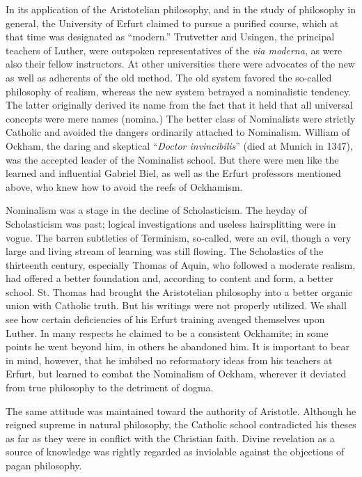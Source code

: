 In its application of the Aristotelian philosophy, and in the study
of philosophy in general, the University of Erfurt claimed to pursue
a purified course, which at that time was designated as “modern.”
Trutvetter and Usingen, the principal teachers of Luther, were outspoken
representatives of the \textit{via moderna}, as were also their fellow
instructors. At other universities there were advocates of the new as
well as adherents of the old method. The old system favored the so-called
philosophy of realism, whereas the new system betrayed
a nominalistic tendency. The latter originally derived its name
from the fact that it held that all universal concepts were mere
names (nomina.) The better class of Nominalists were strictly Catholic
and avoided the dangers ordinarily attached to Nominalism. William
of Ockham, the daring and skeptical “\textit{Doctor invincibilis}” (died
at Munich in 1347), was the accepted leader of the Nominalist school.
But there were men like the learned and influential Gabriel Biel, as
well as the Erfurt professors mentioned above, who knew how to
avoid the reefs of Ockhamism.

Nominalism was a stage in the decline of Scholasticism. The heyday
of Scholasticism was past; logical investigations and useless hairsplitting
were in vogue. The barren subtleties of Terminism, so-called,
were an evil, though a very large and living stream of learning was
still flowing. The Scholastics of the thirteenth century, especially
Thomas of Aquin, who followed a moderate realism, had offered a
better foundation and, according to content and form, a better
school. St. Thomas had brought the Aristotelian philosophy into a
better organic union with Catholic truth. But his writings were not
properly utilized. We shall see how certain deficiencies of his Erfurt
training avenged themselves upon Luther. In many respects he
claimed to be a consistent Ockhamite; in some points he went beyond
him, in others he abandoned him. It is important to bear in
mind, however, that he imbibed no reformatory ideas from his
teachers at Erfurt, but learned to combat the Nominalism of Ockham,
wherever it deviated from true philosophy to the detriment of
dogma.

The same attitude was maintained toward the authority of Aristotle.
Although he reigned supreme in natural philosophy, the Catholic
school contradicted his theses as far as they were in conflict with
the Christian faith. Divine revelation as a source of knowledge was
rightly regarded as inviolable against the objections of pagan philosophy.

